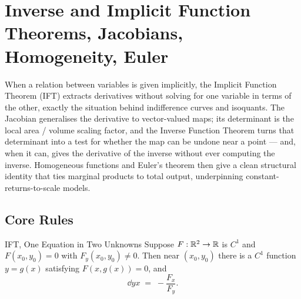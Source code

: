 \chapter{Inverse and Implicit Function Theorems, Jacobians, Homogeneity, Euler}

When a relation between variables is given implicitly, the Implicit
Function Theorem (IFT) extracts derivatives without solving for one
variable in terms of the other, exactly the situation behind
indifference curves and isoquants. The Jacobian generalises the derivative
to vector-valued maps; its determinant is the local area / volume scaling
factor, and the Inverse Function Theorem turns that determinant into a test
for whether the map can be undone near a point --- and, when it can, gives
the derivative of the inverse without ever computing the inverse.
Homogeneous functions and Euler's theorem then give a clean
structural identity that ties marginal products to total output,
underpinning constant-returns-to-scale models.

\section{Core Rules}

\begin{rulebox}{IFT, One Equation in Two Unknowns}
Suppose $F:\mathbb{R}^{2}\to\mathbb{R}$ is $C^{1}$ and $F(x_{0},y_{0})=0$ with
$F_{y}(x_{0},y_{0})\neq 0$. Then near $(x_{0},y_{0})$ there is a $C^{1}$
function $y=g(x)$ satisfying $F(x,g(x))=0$, and
\[
  \dd{y}{x} \;=\; -\frac{F_{x}}{F_{y}} .
\]
\end{rulebox}

